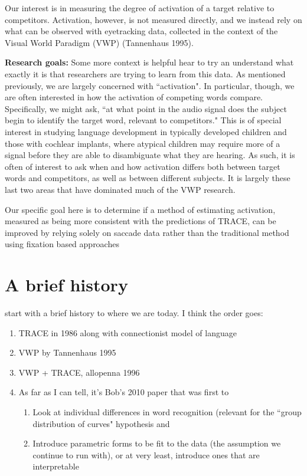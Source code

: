 \documentclass{article}
\begin{document}
Our interest is in measuring the degree of activation of a target relative to competitors. Activation, however, is not measured directly, and we instead rely on what can be observed with eyetracking data, collected in the context of the Visual World Paradigm (VWP) (Tannenhaus 1995)\cite{tanenhaus1995integration}. 

\textbf{Research goals: } Some more context is helpful hear to try an understand what exactly it is that researchers are trying to learn from this data. As mentioned previously, we are largely concerned with ``activation". In particular, though, we are often interested in how the activation of competing words compare. Specifically, we might ask, ``at what point in the audio signal does the subject begin to identify the target word, relevant to competitors." This is of special interest in studying language development in typically developed children and those with cochlear implants, where atypical children may require more of a signal before they are able to disambiguate what they are hearing. As such, it is often of interest to ask when and how activation differs both between target words and competitors, as well as between different subjects. It is largely these last two areas that have dominated much of the VWP research.

Our specific goal here is to determine if a method of estimating activation, measured as being more consistent with the predictions of TRACE, can be improved by relying solely on saccade data rather than the traditional method using fixation based approaches


\section{A brief history}
start with a brief history to where we are today. I think the order goes:

\begin{singlespace}
\begin{enumerate}
\vspace{-2mm}
\item TRACE in 1986 along with connectionist model of language
\item VWP by Tannenhaus 1995
\item VWP + TRACE, allopenna 1996
\item As far as I can tell, it's Bob's 2010 paper that was first to 
\begin{enumerate}
\item Look at individual differences in word recognition (relevant for the ``group distribution of curves" hypothesis and
\item Introduce parametric forms to be fit to the data (the assumption we continue to run with), or at very least, introduce ones that are interpretable
\end{enumerate}
\end{enumerate}
\end{singlespace}
\end{document}
